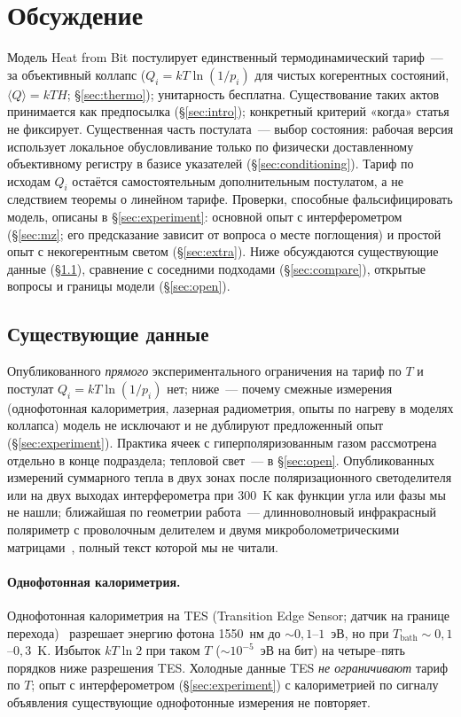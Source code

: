 \documentclass[11pt,a4paper]{article}
\newcommand{\Sref}[1]{\hyperref[#1]{\S\ref{#1}}}
\begin{document}
\section{Обсуждение}\label{sec:discussion}

Модель Heat from Bit постулирует единственный термодинамический тариф~--- за объективный коллапс ($Q_i = kT\ln(1/p_i)$ для чистых когерентных состояний, $\langle Q\rangle = kT H$; \Sref{sec:thermo}); унитарность бесплатна. Существование таких актов принимается как предпосылка (\Sref{sec:intro}); конкретный критерий «когда» статья не фиксирует. Существенная часть постулата~--- выбор состояния: рабочая версия использует локальное обусловливание только по физически доставленному объективному регистру в базисе указателей (\Sref{sec:conditioning}). Тариф по исходам $Q_i$ остаётся самостоятельным дополнительным постулатом, а не следствием теоремы о линейном тарифе. Проверки, способные фальсифицировать модель, описаны в \Sref{sec:experiment}: основной опыт с интерферометром (\Sref{sec:mz}; его предсказание зависит от вопроса о месте поглощения) и простой опыт с некогерентным светом (\Sref{sec:extra}). Ниже обсуждаются существующие данные (\Sref{sec:data}), сравнение с соседними подходами (\Sref{sec:compare}), открытые вопросы и границы модели (\Sref{sec:open}).

\subsection{Существующие данные}\label{sec:data}

Опубликованного \emph{прямого} экспериментального ограничения на тариф по $T$ и постулат $Q_i=kT\ln(1/p_i)$ нет; ниже~--- почему смежные измерения (однофотонная калориметрия, лазерная радиометрия, опыты по нагреву в моделях коллапса) модель не исключают и не дублируют предложенный опыт (\Sref{sec:experiment}). Практика ячеек с гиперполяризованным газом рассмотрена отдельно в конце подраздела; тепловой свет~--- в \Sref{sec:open}. Опубликованных измерений суммарного тепла в двух зонах после поляризационного светоделителя или на двух выходах интерферометра при 300~K как функции угла или фазы мы не нашли; ближайшая по геометрии работа~--- длинноволновый инфракрасный поляриметр с проволочным делителем и двумя микроболометрическими матрицами~\cite{kudenov2009}, полный текст которой мы не читали.

\paragraph{Однофотонная калориметрия.}
Однофотонная калориметрия на TES (Transition Edge Sensor; датчик на границе перехода)~\cite{karimi2020} разрешает энергию фотона 1550~нм до $\sim 0{,}1$--$1$~эВ, но при $T_{\mathrm{bath}}\sim 0{,}1$--$0{,}3$~K. Избыток $kT\ln 2$ при таком $T$ ($\sim 10^{-5}$~эВ на бит) на четыре--пять порядков ниже разрешения TES. Холодные данные TES \emph{не ограничивают} тариф по $T$; опыт с интерферометром (\Sref{sec:experiment}) с калориметрией по сигналу объявления существующие однофотонные измерения не повторяет.
\end{document}
